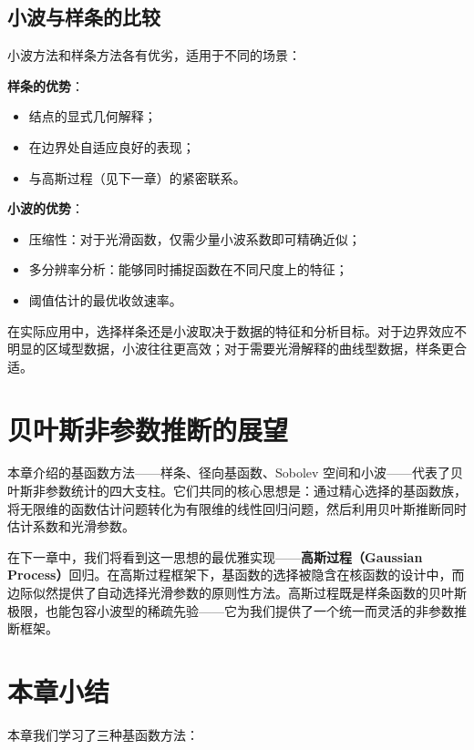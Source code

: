 \subsection{小波与样条的比较}\label{sec:wavelet-vs-spline}

小波方法和样条方法各有优劣，适用于不同的场景：

\textbf{样条的优势}：
\begin{itemize}
\item 结点的显式几何解释；
\item 在边界处自适应良好的表现；
\item 与高斯过程（见下一章）的紧密联系。
\end{itemize}

\textbf{小波的优势}：
\begin{itemize}
\item 压缩性：对于光滑函数，仅需少量小波系数即可精确近似；
\item 多分辨率分析：能够同时捕捉函数在不同尺度上的特征；
\item 阈值估计的最优收敛速率。
\end{itemize}

在实际应用中，选择样条还是小波取决于数据的特征和分析目标。对于边界效应不明显的区域型数据，小波往往更高效；对于需要光滑解释的曲线型数据，样条更合适。

\section{贝叶斯非参数推断的展望}\label{sec:basis-functions-outlook}

本章介绍的基函数方法——样条、径向基函数、Sobolev 空间和小波——代表了贝叶斯非参数统计的四大支柱。它们共同的核心思想是：通过精心选择的基函数族，将无限维的函数估计问题转化为有限维的线性回归问题，然后利用贝叶斯推断同时估计系数和光滑参数。

在下一章中，我们将看到这一思想的最优雅实现——\textbf{高斯过程（Gaussian Process）}回归。在高斯过程框架下，基函数的选择被隐含在核函数的设计中，而边际似然提供了自动选择光滑参数的原则性方法。高斯过程既是样条函数的贝叶斯极限，也能包容小波型的稀疏先验——它为我们提供了一个统一而灵活的非参数推断框架。

\section{本章小结}

本章我们学习了三种基函数方法：

